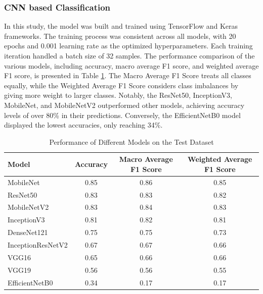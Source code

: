 \documentclass[11pt]{article}
\begin{document}
\subsubsection{CNN based Classification}
In this study, the model was built and trained using TensorFlow and Keras frameworks. The training process was consistent across all models, with 20 epochs and 0.001 learning rate as the optimized hyperparameters. Each training iteration handled a batch size of 32 samples. The performance comparison of the various models, including accuracy, macro average F1 score, and weighted average F1 score, is presented in Table \ref{tab:cnn_results}. The Macro Average F1 Score treats all classes equally, while the Weighted Average F1 Score considers class imbalances by giving more weight to larger classes. Notably, the ResNet50, InceptionV3, MobileNet, and MobileNetV2 outperformed other models, achieving accuracy levels of over 80\% in their predictions. Conversely, the EfficientNetB0 model displayed the lowest accuracies, only reaching 34\%.


\begin{table}[H]
    \centering
    \caption{Performance of Different Models on the Test Dataset}\label{tab:cnn_results}
    \begin{tabular}{l c c c}
        \toprule
        \textbf{Model} & \textbf{Accuracy} & \textbf{Macro Average F1 Score} & \textbf{Weighted Average F1 Score} \\
        \midrule
        MobileNet & 0.85 & 0.86 & 0.85 \\
        ResNet50 & 0.83 & 0.83 & 0.82 \\
        MobileNetV2 & 0.83 & 0.84 & 0.83 \\        
        InceptionV3 & 0.81 & 0.82 & 0.81 \\
        DenseNet121 & 0.75 & 0.75 & 0.73 \\
        InceptionResNetV2 & 0.67 & 0.67 & 0.66 \\
        VGG16 & 0.65 & 0.66 & 0.66 \\
        VGG19 & 0.56 & 0.56 & 0.55 \\        
        EfficientNetB0 & 0.34 & 0.17 & 0.17 \\
        \bottomrule
    \end{tabular}
\end{table}
\end{document}
